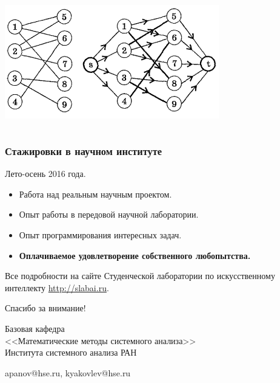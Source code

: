 \documentclass[default]{beamer}
\begin{document}
\begin{frame}
\begin{columns}
\begin{column}{0.5\textwidth}
				\par\bigskip
				\includegraphics[width=0.7\textwidth]{advert/graph}
			\end{column}			
		\end{columns}
	\end{frame}

	\begin{frame}
		\frametitle{Стажировки в научном институте}
		
		Лето-осень 2016 года.
		\par\bigskip
		\begin{itemize}
			\item Работа над реальным научным проектом.
			\item Опыт работы в передовой научной лаборатории.
			\item Опыт программирования интересных задач.
			\item \textbf{Оплачиваемое удовлетворение собственного любопытства.}
		\end{itemize}
		\par\bigskip
		Все подробности на сайте Студенческой лаборатории по искусственному интеллекту \url{http://slabai.ru}.
	\end{frame}
	
	\begin{frame}
		\centering
		\Huge
		Спасибо за внимание!
		\normalsize
		\par\bigskip
		\par\bigskip
		Базовая кафедра\\
		<<Математические методы системного анализа>>\\
		Института системного анализа РАН
		\par\bigskip
		\par\bigskip
		apanov@hse.ru, kyakovlev@hse.ru
	\end{frame}
														
\end{document}
